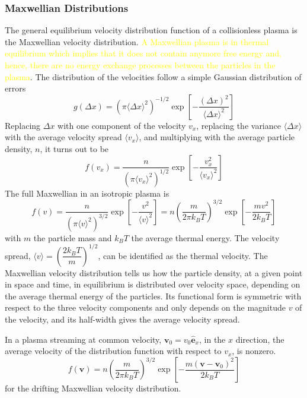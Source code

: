 \documentclass[12pt,a4paper]{article}
\renewcommand{\vec}[1]{\boldsymbol{#1}}
\begin{document}
\subsubsection{Maxwellian Distributions}
The general equilibrium velocity distribution function of a collisionless plasma is the Maxwellian velocity distribution. \textcolor{yellow}{A Maxwellian plasma is in thermal equilibrium which implies that it does not contain anymore free energy and, hence, there are no energy exchange processes between the particles in the plasma}. The distribution of the velocities follow a simple Gaussian distribution of errors
\begin{equation}
g(\Delta x) = (\pi \langle \Delta x \rangle^2 )^{-1/2} \exp \left[-\frac{(\Delta x)^2}{\langle \Delta x \rangle^2} \right]
\end{equation}
Replacing $\Delta x$ with one component of the velocity $v_x$, replacing the variance $\langle \Delta x \rangle$ with the average velocity spread $\langle v_x \rangle$, and multiplying with the average particle density, $n$, it turns out to be
\begin{equation*}
f(v_x) = \frac{n}{(\pi \langle v_x \rangle^2 )^{1/2} } \exp \left[-\frac{v_x^2}{\langle v_x \rangle^2} \right]
\end{equation*}
The full Maxwellian in an isotropic plasma is
\begin{equation*}
f(v) = \frac{n}{(\pi \langle v \rangle^2 )^{3/2} } \exp \left[-\frac{v^2}{\langle v \rangle^2} \right] = n\left(\frac{m}{2\pi k_BT} \right)^{3/2} \exp \left[-\frac{ m v^2}{2k_B T} \right]
\end{equation*}
with $m$ the particle mass and $k_B T$ the average thermal energy. The velocity spread, $\langle v \rangle = \left( \dfrac{2k_BT}{m} \right)^{1/2}$, can be identified as the thermal velocity.  The Maxwellian velocity distribution tells us how the particle density, at a given point in space and time, in equilibrium is distributed over velocity space, depending on the average thermal energy of the particles. Its functional form is symmetric with respect to the three velocity components and only depends on the magnitude $v$ of the velocity, and its half-width gives the average velocity spread.

In a plasma streaming at common velocity, $\vec{v}_0 = v_0 \hat{\vec{e}}_x$, in the $x$ direction, the average velocity of the distribution function with respect to $v_x$, is nonzero.
\begin{equation*}
f(\vec{v}) = n\left(\frac{m}{2\pi k_BT} \right)^{3/2} \exp \left[-\frac{ m (\vec{v} -\vec{v}_0)^2}{2k_B T} \right]
\end{equation*}
for the drifting Maxwellian velocity distribution.
\end{document}
